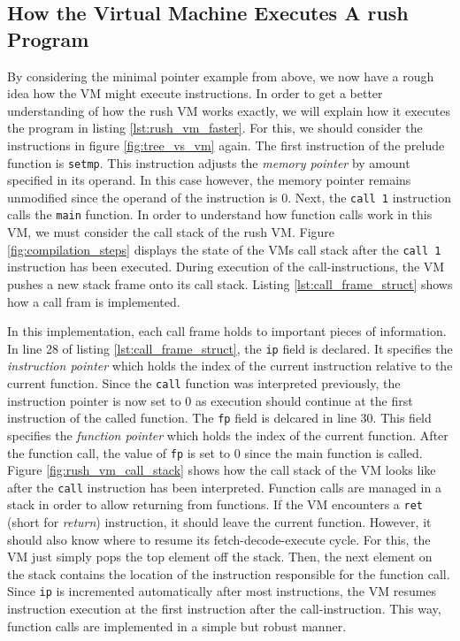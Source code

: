 \subsection{How the Virtual Machine Executes A rush Program}

By considering the minimal pointer example from above, we now have a rough idea how the VM might execute instructions.
In order to get a better understanding of how the rush VM works exactly, we will explain how it executes the program in listing \ref{lst:rush_vm_faster}.
For this, we should consider the instructions in figure \ref{fig:tree_vs_vm} again.
The first instruction of the prelude function is \texttt{setmp}.
This instruction adjusts the \emph{memory pointer} by amount specified in its operand.
In this case however, the memory pointer remains unmodified since the operand of the instruction is 0.
Next, the \texttt{call 1} instruction calls the \texttt{main} function.
In order to understand how function calls work in this VM, we must consider the call stack of the rush VM.
Figure \ref{fig:compilation_steps} displays the state of the VMs call stack after the \texttt{call 1} instruction has been executed.
During execution of the call-instructions, the VM pushes a new stack frame onto its call stack.
Listing \ref{lst:call_frame_struct} shows how a call fram is implemented.


In this implementation, each call frame holds to important pieces of information.
In line 28 of listing \ref{lst:call_frame_struct}, the \texttt{ip} field is declared.
It specifies the \emph{instruction pointer} which holds the index of the current instruction relative to the current function.
Since the \texttt{call} function was interpreted previously, the instruction pointer is now set to 0 as execution should continue at the first instruction of the called function.
The \texttt{fp} field is delcared in line 30.
This field specifies the \emph{function pointer} which holds the index of the current function.
After the function call, the value of \texttt{fp} is set to 0 since the main function is called.
Figure \ref{fig:rush_vm_call_stack} shows how the call stack of the VM looks like after the \texttt{call} instruction has been interpreted.
Function calls are managed in a stack in order to allow returning from functions.
If the VM encounters a \texttt{ret} (short for \emph{return}) instruction, it should leave the current function.
However, it should also know where to resume its fetch-decode-execute cycle.
For this, the VM just simply pops the top element off the stack.
Then, the next element on the stack contains the location of the instruction responsible for the function call.
Since \texttt{ip} is incremented automatically after most instructions, the VM resumes instruction execution at the first instruction after the call-instruction.
This way, function calls are implemented in a simple but robust manner.

